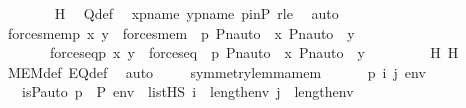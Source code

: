 \begin{isabellebody}
\ \ \ \ \ \ \isamarkupfalse%
\ H\ \isamarkupfalse%
\ Q{\isacharunderscore}{\kern0pt}def\ \isamarkupfalse%
\ xpname\ ypname\ pinP\ rle\ \isamarkupfalse%
\ auto\ \isamarkupfalse%
\ \isanewline
\ \ \ \ \isanewline
\ \ \ \ \isamarkupfalse%
\ {\isachardoublequoteopen}{\isacharparenleft}{\kern0pt}forces{\isacharunderscore}{\kern0pt}mem{\isacharparenleft}{\kern0pt}p{\isacharcomma}{\kern0pt}\ x{\isacharcomma}{\kern0pt}\ y{\isacharparenright}{\kern0pt}\ {\isasymlongleftrightarrow}\ forces{\isacharunderscore}{\kern0pt}mem{\isacharparenleft}{\kern0pt}{\isasympi}\ {\isacharbackquote}{\kern0pt}\ p{\isacharcomma}{\kern0pt}\ Pn{\isacharunderscore}{\kern0pt}auto{\isacharparenleft}{\kern0pt}{\isasympi}{\isacharparenright}{\kern0pt}\ {\isacharbackquote}{\kern0pt}\ x{\isacharcomma}{\kern0pt}\ Pn{\isacharunderscore}{\kern0pt}auto{\isacharparenleft}{\kern0pt}{\isasympi}{\isacharparenright}{\kern0pt}\ {\isacharbackquote}{\kern0pt}\ y{\isacharparenright}{\kern0pt}{\isacharparenright}{\kern0pt}\ {\isasymand}\isanewline
\ \ \ \ \ \ \ {\isacharparenleft}{\kern0pt}forces{\isacharunderscore}{\kern0pt}eq{\isacharparenleft}{\kern0pt}p{\isacharcomma}{\kern0pt}\ x{\isacharcomma}{\kern0pt}\ y{\isacharparenright}{\kern0pt}\ {\isasymlongleftrightarrow}\ forces{\isacharunderscore}{\kern0pt}eq{\isacharparenleft}{\kern0pt}{\isasympi}\ {\isacharbackquote}{\kern0pt}\ p{\isacharcomma}{\kern0pt}\ Pn{\isacharunderscore}{\kern0pt}auto{\isacharparenleft}{\kern0pt}{\isasympi}{\isacharparenright}{\kern0pt}\ {\isacharbackquote}{\kern0pt}\ x{\isacharcomma}{\kern0pt}\ Pn{\isacharunderscore}{\kern0pt}auto{\isacharparenleft}{\kern0pt}{\isasympi}{\isacharparenright}{\kern0pt}\ {\isacharbackquote}{\kern0pt}\ y{\isacharparenright}{\kern0pt}{\isacharparenright}{\kern0pt}{\isachardoublequoteclose}\ \isanewline
\ \ \ \ \ \ \isamarkupfalse%
\ H{}\ H{}\ \isamarkupfalse%
\ MEM{\isacharunderscore}{\kern0pt}def\ EQ{\isacharunderscore}{\kern0pt}def\ \isamarkupfalse%
\ auto\ \isanewline
\ \ \isamarkupfalse%
%
\endisatagproof
{\isafoldproof}%
%
\isadelimproof
\isanewline
%
\endisadelimproof
\isanewline
\isanewline
{}\isamarkupfalse%
\ symmetry{\isacharunderscore}{\kern0pt}lemma{\isacharunderscore}{\kern0pt}mem\ {\isacharcolon}{\kern0pt}\ \isanewline
\ \ \ {\isasympi}\ p\ i\ j\ env\isanewline
\ \ \ {\isachardoublequoteopen}is{\isacharunderscore}{\kern0pt}P{\isacharunderscore}{\kern0pt}auto{\isacharparenleft}{\kern0pt}{\isasympi}{\isacharparenright}{\kern0pt}{\isachardoublequoteclose}\ {\isachardoublequoteopen}p\ {\isasymin}\ P{\isachardoublequoteclose}\ {\isachardoublequoteopen}env\ {\isasymin}\ list{\isacharparenleft}{\kern0pt}HS{\isacharparenright}{\kern0pt}{\isachardoublequoteclose}\ {\isachardoublequoteopen}i\ {\isacharless}{\kern0pt}\ length{\isacharparenleft}{\kern0pt}env{\isacharparenright}{\kern0pt}{\isachardoublequoteclose}\ {\isachardoublequoteopen}j\ {\isacharless}{\kern0pt}\ length{\isacharparenleft}{\kern0pt}env{\isacharparenright}{\kern0pt}{\isachardoublequoteclose}\ \isanewline

\end{isabellebody}
